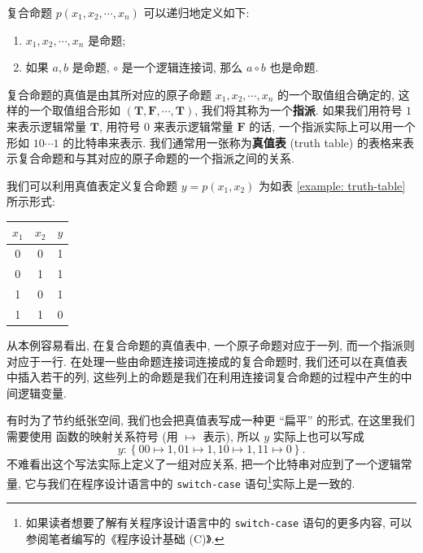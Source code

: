 \documentclass[10pt,UTF8]{book} %
\begin{document}
\begin{definition}[复合命题]
    复合命题 $p(x_1, x_2, \cdots, x_n)$ 可以递归地定义如下:
    \begin{enumerate}[label={$\left.\arabic*\right)$}, itemsep=0pt]
        \item $x_1, x_2, \cdots, x_n$ 是命题;
        \item 如果 $a, b$ 是命题, $\circ$ 是一个逻辑连接词, 那么 $a \circ b$
        也是命题.
    \end{enumerate}
\end{definition}



复合命题的真值是由其所对应的原子命题 $x_1, x_2, \cdots, x_n$ 的一个取值组合确定的, 这样的一个取值组合形如
$(\mathbf{T}, \mathbf{F}, \cdots, \mathbf{T})$, 我们将其称为一个\textbf{指派}.
如果我们用符号 $1$ 来表示逻辑常量 $\mathbf{T}$, 用符号 $0$ 来表示逻辑常量 $\mathbf{F}$ 的话,
一个指派实际上可以用一个形如 $10\cdots1$ 的比特串来表示. 我们通常用一张称为\textbf{真值表}
(truth table) 的表格来表示复合命题和与其对应的原子命题的一个指派之间的关系.

\begin{example}
    \label{与非运算}
    我们可以利用真值表定义复合命题 $y = p(x_1, x_2)$ 为如表 \ref{example: truth-table} 所示形式:
    {
    \label{example: truth-table} %
    \begin{longtable}{cc|c}
        \toprule
        $x_1$ & $x_2$ & $y$ \\
        \midrule
        \endhead
        \bottomrule
        \endfoot
    
        0 & 0 & 1 \\
        0 & 1 & 1 \\
        1 & 0 & 1 \\
        1 & 1 & 0 \\
    \end{longtable}}
    从本例容易看出, 在复合命题的真值表中, 一个原子命题对应于一列, 而一个指派则对应于一行.
    在处理一些由命题连接词连接成的复合命题时, 我们还可以在真值表中插入若干的列,
    这些列上的命题是我们在利用连接词复合命题的过程中产生的中间逻辑变量.

    有时为了节约纸张空间, 我们也会把真值表写成一种更 “扁平” 的形式, 在这里我们需要使用
    函数的映射关系符号 (用 $\mapsto$ 表示), 所以 $y$ 实际上也可以写成
    \[ y: \left\{
        00 \mapsto 1,
        01 \mapsto 1,
        10 \mapsto 1,
        11 \mapsto 0
    \right\}. \]
    不难看出这个写法实际上定义了一组对应关系, 把一个比特串对应到了一个逻辑常量,
    它与我们在程序设计语言中的 \lstinline|switch-case| 语句\footnote{
        如果读者想要了解有关程序设计语言中的 \lstinline|switch-case| 语句的更多内容,
        可以参阅笔者编写的《程序设计基础 (C)》.
    }实际上是一致的.
\end{example}
\end{document}
